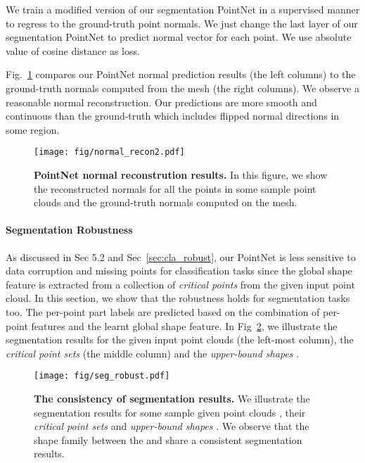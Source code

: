 \documentclass[10pt,twocolumn,letterpaper]{article}
\begin{document}
We train a modified version of our segmentation PointNet in a supervised manner to regress to the ground-truth point normals. We just change the last layer of our segmentation PointNet to predict normal vector for each point. We use absolute value of cosine distance as loss.

Fig.~\ref{fig:normal_recon} compares our PointNet normal prediction results (the left columns) to the ground-truth normals computed from the mesh (the right columns). We observe a reasonable normal reconstruction. Our predictions are more smooth and continuous than the ground-truth which includes flipped normal directions in some region.


\begin{figure}[t!]
\centering
\texttt{[image: fig/normal\_recon2.pdf]}
\caption{\textbf{PointNet normal reconstrution results.} In this figure, we show the reconstructed normals for all the points in some sample point clouds and the ground-truth normals computed on the mesh.}
\label{fig:normal_recon}
\end{figure}

\paragraph{Segmentation Robustness} As discussed in Sec 5.2 and Sec~\ref{sec:cla_robust}, our PointNet is less sensitive to data corruption and missing points for classification tasks since the global shape feature is extracted from a collection of \textit{critical points} from the given input point cloud. In this section, we show that the robustness holds for segmentation tasks too. The per-point part labels are predicted based on the combination of per-point features and the learnt global shape feature. In Fig~\ref{fig:seg_robust}, we illustrate the segmentation results for the given input point clouds  (the left-most column), the \textit{critical point sets}  (the middle column) and the \textit{upper-bound shapes} .


\begin{figure}[t!]
\centering
\texttt{[image: fig/seg\_robust.pdf]}
\caption{\textbf{The consistency of segmentation results.} We illustrate the segmentation results for some sample given point clouds , their \textit{critical point sets}  and \textit{upper-bound shapes} . We observe that the shape family between the  and  share a consistent segmentation results.}
\label{fig:seg_robust}
\end{figure}
\end{document}

